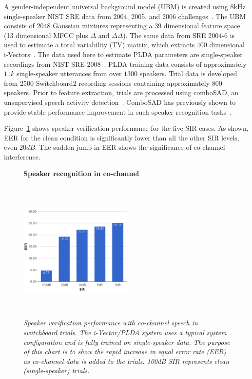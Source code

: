 A gender-independent universal background model (UBM) is created using 8kHz single-speaker NIST SRE data from 2004, 2005, and 2006 challenges~\cite{NIST04,NIST05,NIST06}. 
The UBM consists of $2048$ Gaussian mixtures representing a 39 dimensional feature space (13 dimensional MFCC plus $\Delta$ and $\Delta\Delta$). 
The same data from SRE 2004-6 is used to estimate a total variability (TV) matrix, which extracts $400$ dimensional i-Vectors~\cite{Dehak_ivector}. 
The data used here to estimate PLDA parameters are single-speaker recordings from NIST SRE 2008~\cite{NIST08}. 
PLDA training data consists of approximately $11k$ single-speaker utterances from over $1300$ speakers. 
Trial data is developed from 2500 Switchboard2 recording sessions containing approximately $800$ speakers. 
Prior to feature extraction, trials are processed using comboSAD, an unsupervised speech activity detection~\cite{sadjadi2013unsupervised}. ComboSAD has previously shown to provide stable performance improvement in such speaker recognition tasks~\cite{hasan2013crss}. 

Figure~\ref{fig:cch_in_sid} shows speaker verification performance for the five SIR cases. 
As shown, EER for the clean condition is significantly lower than all the other SIR levels, even $20dB$. 
The sudden jump in EER shows the significance of co-channel interference. 

\begin{figure}[h!]
	\centering
	\textbf{Speaker recognition in co-channel}\par\medskip
	\includegraphics[height = 2.8in, width=0.5\textwidth]{figures/eer_vs_sir_swb2_baseline}
	\vspace{-2mm}
	\caption{\it \small Speaker verification performance with co-channel speech in switchboard trials. The i-Vector/PLDA system uses a typical system configuration and is fully trained on single-speaker data. The purpose of this chart is to show the rapid increase in equal error rate (EER) as co-channel data is added to the trials. 100dB SIR represents clean (single-speaker) trials.}
	\label{fig:cch_in_sid}
	\vspace{-1mm}
\end{figure}

